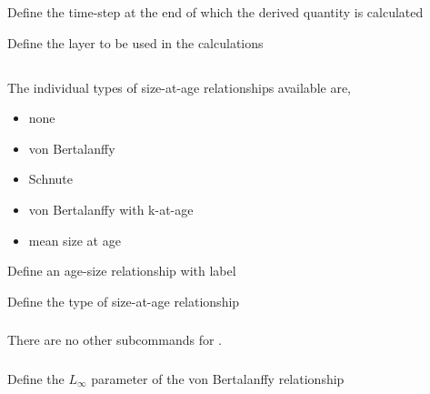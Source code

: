  {Define the time-step at the end of which the derived quantity is calculated}

 {Define the layer to be used in the calculations}

\subsection{}

The individual types of size-at-age relationships available are,

\begin{itemize}
	\item none
	\item von Bertalanffy
	\item Schnute
	\item von Bertalanffy with k-at-age
	\item mean size at age
\end{itemize}

 {Define an age-size relationship with label}

 {Define the type of size-at-age relationship}

\subsubsection[None]{}

There are no other subcommands for .

\subsubsection[von Bertalanffy]{}

 {Define the $L_\infty$ parameter of the von Bertalanffy relationship}


